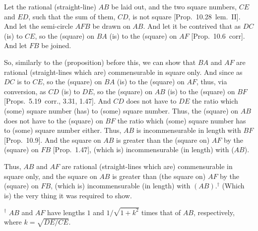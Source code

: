\begin{Parallel}{}{}
{Let the rational (straight-line) $AB$ be laid out, and the two square
numbers, $CE$ and $ED$, such that the sum of them, $CD$,
is not square [Prop.~10.28~lem.~II].
And let the semi-circle $AFB$ be drawn on $AB$. And let it
be contrived that as $DC$ (is) to $CE$, so the (square) on
$BA$ (is) to the (square) on $AF$ [Prop.~10.6~corr].
And let $FB$ be joined.

So, similarly to the (proposition) before this, we can show that $BA$ and
$AF$ are rational (straight-lines which are) commensurable in square only.
And since as $DC$ is to $CE$, so the (square) on $BA$ (is) to the (square)
on $AF$, thus, via conversion, as $CD$ (is) to $DE$, so the (square) on
$AB$ (is) to the (square) on $BF$ [Props.~5.19~corr., 3.31, 1.47]. And
$CD$ does not have to $DE$ the ratio which (some) square number
(has) to (some) square number. Thus, the (square) on $AB$
does not have to the (square) on $BF$ the ratio which (some)
square number has to (some) square number either. Thus, $AB$ is
incommensurable in length with $BF$ [Prop.~10.9].
And the square on $AB$ is greater than the (square on) $AF$ by the
(square) on $FB$  [Prop.~1.47], (which is) incommensurable (in length) with ($AB$).

Thus, $AB$ and $AF$ are rational (straight-lines which are) commensurable
in square only, and the square on $AB$ is greater than (the square on) $AF$
by the (square) on $FB$, (which is) incommensurable (in length) with
 $(AB)$.$^\dag$ (Which is) the very thing it was required to show.}
\end{Parallel}
{\footnotesize\noindent$^\dag$ $AB$ and $AF$ have lengths $1$ and $1/\sqrt{1+k^2}$
times that of $AB$, respectively, where $k=\sqrt{DE/CE}$.}

